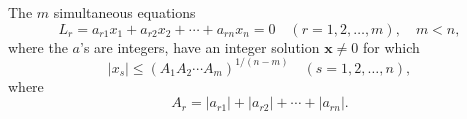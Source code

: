 \begin{proposition}
The $m$ simultaneous equations
\[
    L_r=a_{r1}x_1+a_{r2}x_2+\cdots+a_{rn}x_n=0
    \quad(r=1,2,\ldots,m),\quad m<n,
\]
where the $a$'s are integers, have an integer solution $\mathbf{x}\ne0$ for which
\[
    |x_s|\le (A_1A_2\cdots A_m)^{1/(n-m)}
    \quad(s=1,2,\ldots,n),
\]
where
\[
    A_r=|a_{r1}|+|a_{r2}|+\cdots+|a_{rn}|.
\]
\end{proposition}
